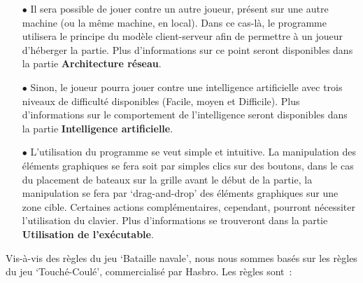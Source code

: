\documentclass[12pt]{article}
\begin{document}
\begin{itemize}
      \item[$\bullet$] Il sera possible de jouer contre un autre joueur,
            présent sur une autre machine (ou la même machine, en local). Dans
            ce cas-là,
            le programme utilisera le principe du modèle client-serveur afin de
            permettre à
            un joueur d'héberger la partie. Plus d'informations sur ce point
            seront
            disponibles dans la partie \textbf{Architecture réseau}.

            \bigskip

      \item[$\bullet$] Sinon, le joueur pourra jouer contre une intelligence
            artificielle avec trois niveaux de difficulté disponibles (Facile,
            moyen et
            Difficile). Plus d'informations sur le comportement de
            l'intelligence seront
            disponibles dans la partie \textbf{Intelligence artificielle}.
            \bigskip

      \item[$\bullet$] L'utilisation du programme se veut simple et intuitive.
            La manipulation des éléments graphiques se fera soit par simples
            clics sur des
            boutons, dans le cas du placement de bateaux sur la grille avant le
            début de la
            partie, la manipulation se fera par `drag-and-drop' des éléments
            graphiques sur
            une zone cible. Certaines actions complémentaires, cependant,
            pourront
            nécessiter l'utilisation du clavier. Plus d'informations se
            trouveront dans la
            partie \textbf{Utilisation de l'exécutable}.
\end{itemize}

\bigskip

Vis-à-vis des règles du jeu `Bataille navale', nous nous sommes basés sur les
règles du jeu `Touché-Coulé', commercialisé par Hasbro. Les règles sont :

\bigskip
\end{document}
